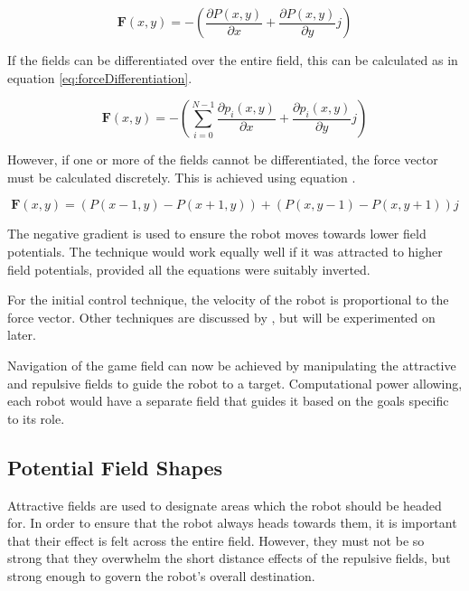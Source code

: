 \documentclass[10pt]{article} \usepackage[a4paper]{geometry}
\begin{document}
\begin{equation}
\boldsymbol{F}(x,y)=-\left(\frac{{\partial P\left(x,y\right)}}{\partial x}+\frac{{\partial P\left(x,y\right)}}{\partial y}j\right)\label{eq:forceSummation}
\end{equation}

If the fields can be differentiated over the entire field, this can be
calculated as in equation \ref{eq:forceDifferentiation}.

\begin{equation}
\boldsymbol{F}(x,y)=-\left(\sum_{i=0}^{N-1}\frac{\partial p_{i}\left(x,y\right)}{\partial x}+\frac{\partial p_{i}\left(x,y\right)}{\partial y}j\right)\label{eq:forceDifferentiation}
\end{equation}

However, if one or more of the fields cannot be differentiated, the force vector
must be calculated discretely. This is achieved using equation .

\begin{equation}
\boldsymbol{F}(x,y)=\left(P\left(x-1,y\right)-P\left(x+1,y\right)\right)+\left(P\left(x,y-1\right)-P\left(x,y+1\right)\right)j
\end{equation}

The negative gradient is used to ensure the robot moves towards lower field
potentials. The technique would work equally well if it was attracted to higher
field potentials, provided all the equations were suitably inverted.

For the initial control technique, the velocity of the robot is proportional to
the force vector. Other techniques are discussed by
\cite{intelligentAlgorithmPathPlanning}, but will be experimented on later.

Navigation of the game field can now be achieved by manipulating the attractive
and repulsive fields to guide the robot to a target. Computational power
allowing, each robot would have a separate field that guides it based on the
goals specific to its role.

\subsection{Potential Field Shapes}

Attractive fields are used to designate areas which the robot should be headed
for. In order to ensure that the robot always heads towards them, it is
important that their effect is felt across the entire field. However, they must
not be so strong that they overwhelm the short distance effects of the repulsive
fields, but strong enough to govern the robot's overall destination.
\end{document}
